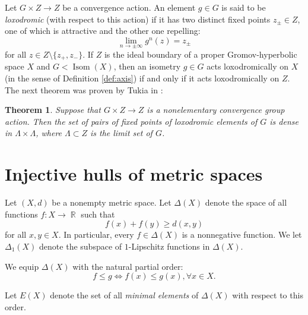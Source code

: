 \documentclass[12pt]{amsbook}%
\newtheorem{thm}{Theorem}[chapter]
\theoremstyle{definition}
\theoremstyle{remark}
\numberwithin{section}{chapter}
\numberwithin{subsection}{section}
\numberwithin{figure}{chapter}
\DeclareMathOperator{\Isom}{Isom}
\DeclareMathOperator{\R}{\mathbb{R}}
\def\La{\Lambda}
\begin{document}
Let $G\times Z\to Z$ be a convergence action. An element $g\in G$ is said to be {\em loxodromic} (with respect to this action) if it has two distinct fixed points $z_\pm \in Z$, one of which is attractive and the other one repelling:
$$ 
\lim_{n\to\pm \infty} g^n(z)=z_\pm
$$
for all $z\in Z\setminus \{z_+, z_-\}$. If $Z$ is the ideal boundary of a proper Gromov-hyperbolic space $X$ and $G< \Isom(X)$, then an isometry $g\in G$ acts loxodromically on $X$ (in the sense of Definition \ref{def:axis}) if and only if it acts loxodromically on $Z$. The next theorem was proven by Tukia in \cite[Theorem 2R]{Tukia}: 

\begin{thm}\label{thm:tukia}
Suppose that $G\times Z\to Z$ is a nonelementary convergence group action. Then the set of pairs of fixed points of loxodromic elements of $G$ is dense in 
$\La\times \La$, where $\La\subset Z$ is the limit set of $G$. 
\end{thm}




\section{Injective hulls of metric spaces}

Let $(X,d)$ be a nonempty metric space. Let $\Delta(X)$ denote the space of all functions $f: X\to \R$ such that
$$
f(x)+f(y)\geqslant d(x,y)
$$
for all $x, y\in X$. In particular, every $f\in \Delta(X)$ is a nonnegative function. We let $\Delta_1(X)$ denote the subspace of $1$-Lipschitz functions 
in $\Delta(X)$. 


We equip $\Delta(X)$ with the natural partial order:
$$
f\leqslant g\iff f(x)\leqslant g(x), \forall x\in X. 
$$

Let $E(X)$ denote the set of all {\em minimal elements} of $\Delta(X)$ with respect to this order.   
\end{document}
